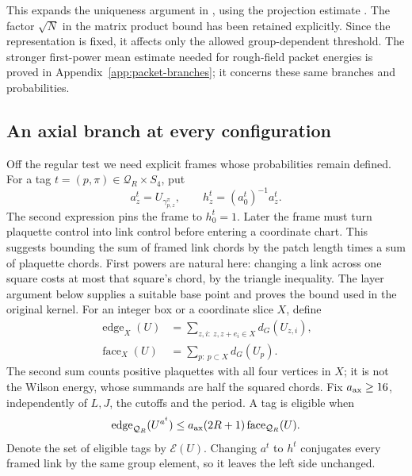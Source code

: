 \documentclass[11pt,reqno]{amsart}
\numberwithin{equation}{section}
\theoremstyle{definition}
\theoremstyle{remark}
\begin{document}
This expands the uniqueness argument in
\cite[Lemma~14.4, pp.~60--61]{Main}, using the projection estimate
\cite[(14.10), p.~59]{Main}. The factor \(\sqrt N\) in the matrix
product bound has been retained explicitly. Since the representation
is fixed, it affects only the allowed group-dependent threshold.
The stronger first-power mean estimate needed for rough-field
packet energies is proved in Appendix~\ref{app:packet-branches};
it concerns these same branches and probabilities.

\subsection{An axial branch at every configuration}

Off the regular test we need explicit frames whose probabilities
remain defined. For a tag \(t=(p,\pi)\in\mathcal Q_R\times S_4\),
put
\begin{equation}
       a_z^t=U_{\gamma^\pi_{p,z}},\qquad
       h_z^t=(a_0^t)^{-1}a_z^t.
 \label{eq:axial-frame}
\end{equation}
The second expression pins the frame to \(h_0^t=1\).
Later the frame must turn plaquette control into link control
before entering a coordinate chart. This suggests bounding the
sum of framed link chords by the patch length times a sum of
plaquette chords. First powers are natural here: changing a link
across one square costs at most that square's chord, by the
triangle inequality. The layer argument below supplies a suitable
base point and proves the bound used in the original kernel.
For an integer box or a coordinate slice \(X\), define
\begin{equation}
 \begin{split}
 \operatorname{edge}_X(U)&=\sum_{z,i:\ z,z+e_i\in X}d_G(U_{z,i}),\\
 \operatorname{face}_X(U)&=\sum_{p:\ p\subset X}d_G(U_p).
 \end{split}
 \label{eq:axial-costs}
\end{equation}
The second sum counts positive plaquettes with all four vertices
in \(X\); it is not the Wilson energy, whose summands are half
the squared chords. Fix \(a_{\rm ax}\ge16\), independently of
\(L,J\), the cutoffs and the period. A tag is eligible when
\begin{equation}
 \operatorname{edge}_{\mathcal Q_R}(U^{a^t})
      \le a_{\rm ax}(2R+1)\operatorname{face}_{\mathcal Q_R}(U).
 \label{eq:axial-eligible}
\end{equation}
Denote the set of eligible tags by \(\mathcal E(U)\).
Changing \(a^t\) to \(h^t\) conjugates every framed link by the
same group element, so it leaves the left side unchanged.
\end{document}
